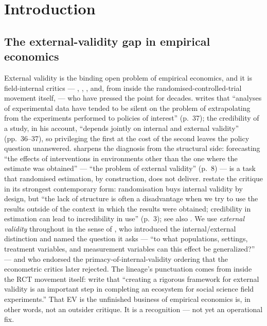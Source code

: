 %

\chapter{Introduction}
\label{ch:introduction}

\section{The external-validity gap in empirical economics}
\label{sec:intro:ev-gap}

External validity is the binding open problem of empirical economics, and it is field-internal critics --- \citeauthor{Manski2013}, \citeauthor{Heckman2008}, \citeauthor{Deaton2010}, and, from inside the randomised-controlled-trial movement itself, \citeauthor{Snowberg2016} --- who have pressed the point for decades. \citet{Manski2013} writes that ``analyses of experimental data have tended to be silent on the problem of extrapolating from the experiments performed to policies of interest'' (p.~37); the credibility of a study, in his account, ``depends jointly on internal and external validity'' (pp.~36--37), so privileging the first at the cost of the second leaves the policy question unanswered. \citet{Heckman2008} sharpens the diagnosis from the structural side: forecasting ``the effects of interventions in environments other than the one where the estimate was obtained'' --- ``the problem of external validity'' (p.~8) --- is a task that randomised estimation, by construction, does not deliver. \citet{Deaton2018} restate the critique in its strongest contemporary form: randomisation buys internal validity by design, but ``the lack of structure is often a disadvantage when we try to use the results outside of the context in which the results were obtained; credibility in estimation can lead to incredibility in use'' (p.~3); see also \citet{Deaton2010}. We use \emph{external validity} throughout in the sense of \citet[p.~5]{CampbellStanley1963}, who introduced the internal/external distinction and named the question it asks --- ``to what populations, settings, treatment variables, and measurement variables can this effect be generalized?'' --- and who endorsed the primacy-of-internal-validity ordering that the econometric critics later rejected. The lineage's punctuation comes from inside the RCT movement itself: \citet{Snowberg2016} write that ``creating a rigorous framework for external validity is an important step in completing an ecosystem for social science field experiments.'' That EV is the unfinished business of empirical economics is, in other words, not an outsider critique. It is a recognition --- not yet an operational fix.

